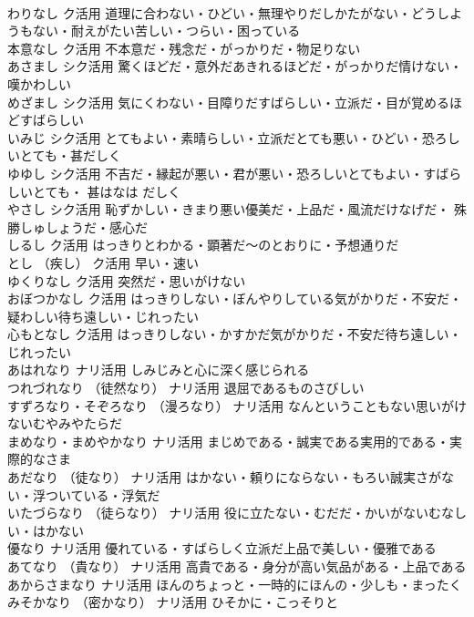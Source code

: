 \documentclass[8pt]{extreport}
\begin{document}
\begin{CJK}{UTF8}{min}
\\	わりなし		ク活用	道理に合わない・ひどい・無理やりだしかたがない・どうしようもない・耐えがたい苦しい・つらい・困っている
\\	本意なし		ク活用	不本意だ・残念だ・がっかりだ・物足りない
\\	あさまし		シク活用	驚くほどだ・意外だあきれるほどだ・がっかりだ情けない・嘆かわしい
\\	めざまし		シク活用	気にくわない・目障りだすばらしい・立派だ・目が覚めるほどすばらしい
\\	いみじ		シク活用	とてもよい・素晴らしい・立派だとても悪い・ひどい・恐ろしいとても・甚だしく
\\	ゆゆし		シク活用	不吉だ・縁起が悪い・君が悪い・恐ろしいとてもよい・すばらしいとても・ 甚はなは だしく
\\	やさし		シク活用	恥ずかしい・きまり悪い優美だ・上品だ・風流だけなげだ・ 殊勝しゅしょうだ・感心だ
\\	しるし		ク活用	はっきりとわかる・顕著だ～のとおりに・予想通りだ
\\	とし	（疾し）	ク活用	早い・速い
\\	ゆくりなし		ク活用	突然だ・思いがけない
\\	おぼつかなし		ク活用	はっきりしない・ぼんやりしている気がかりだ・不安だ・疑わしい待ち遠しい・じれったい
\\	心もとなし		ク活用	はっきりしない・かすかだ気がかりだ・不安だ待ち遠しい・じれったい
\\	あはれなり		ナリ活用	しみじみと心に深く感じられる
\\	つれづれなり	（徒然なり）	ナリ活用	退屈であるものさびしい
\\	すずろなり・そぞろなり	（漫ろなり）	ナリ活用	なんということもない思いがけないむやみやたらだ
\\	まめなり・まめやかなり		ナリ活用	まじめである・誠実である実用的である・実際的なさま
\\	あだなり	（徒なり）	ナリ活用	はかない・頼りにならない・もろい誠実さがない・浮ついている・浮気だ
\\	いたづらなり	（徒らなり）	ナリ活用	役に立たない・むだだ・かいがないむなしい・はかない
\\	優なり		ナリ活用	優れている・すばらしく立派だ上品で美しい・優雅である
\\	あてなり	（貴なり）	ナリ活用	高貴である・身分が高い気品がある・上品である
\\	あからさまなり		ナリ活用	ほんのちょっと・一時的にほんの・少しも・まったく
\\	みそかなり	（密かなり）	ナリ活用	ひそかに・こっそりと

\end{CJK}
\end{document}
